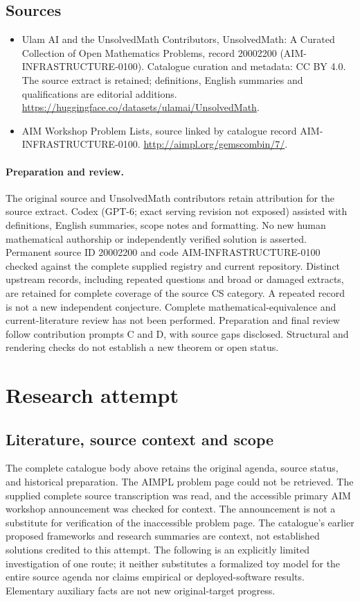 \documentclass[11pt]{article}
\begin{document}
\subsection{Sources}
\begin{itemize}
\item[S1] Ulam AI and the UnsolvedMath Contributors, UnsolvedMath: A Curated Collection of Open Mathematics Problems, record 20002200 (AIM-INFRASTRUCTURE-0100). Catalogue curation and metadata: CC BY 4.0. The source extract is retained; definitions, English summaries and qualifications are editorial additions.
\url{https://huggingface.co/datasets/ulamai/UnsolvedMath}.
\item[S2] AIM Workshop Problem Lists, source linked by catalogue record AIM-INFRASTRUCTURE-0100.
\url{http://aimpl.org/gemscombin/7/}.
\end{itemize}
\paragraph{Preparation and review.}
The original source and UnsolvedMath contributors retain attribution for the source extract. Codex (GPT-6; exact serving revision not exposed) assisted with definitions, English summaries, scope notes and formatting. No new human mathematical authorship or independently verified solution is asserted. Permanent source ID 20002200 and code AIM-INFRASTRUCTURE-0100 checked against the complete supplied registry and current repository. Distinct upstream records, including repeated questions and broad or damaged extracts, are retained for complete coverage of the source CS category. A repeated record is not a new independent conjecture. Complete mathematical-equivalence and current-literature review has not been performed. Preparation and final review follow contribution prompts C and D, with source gaps disclosed. Structural and rendering checks do not establish a new theorem or open status.
\label{end:20002200}

\section{Research attempt}
\subsection{Literature, source context and scope}
The complete catalogue body above retains the original agenda, source status, and historical preparation. The AIMPL problem page could not be retrieved. The supplied complete source transcription was read, and the accessible primary AIM workshop announcement was checked for context. The announcement is not a substitute for verification of the inaccessible problem page. The catalogue's earlier proposed frameworks and research summaries are context, not established solutions credited to this attempt. The following is an explicitly limited investigation of one route; it neither substitutes a formalized toy model for the entire source agenda nor claims empirical or deployed-software results. Elementary auxiliary facts are not new original-target progress.
\end{document}
